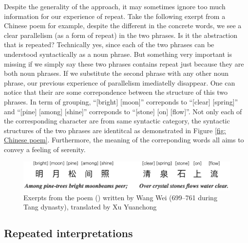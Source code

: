 Despite the generality of the approach, it may sometimes ignore too much information for our experience of repeat. Take the following exerpt from a Chinese poem for example, despite the different in the concrete words, we see a clear parallelism (as a form of repeat) in the two phrases. Is it the abstraction that is repeated? Technically yes, since each of the two phrases can be understood syntactically as a noun phrase. But something very important is missing if we simply say these two phrases contains repeat just because they are both noun phrases. If we substitute the second phrase with any other noun phrase, our previous experience of parallelism imediatelly disappear. One can notice that their are some correpondence between the structure of this two phrases. In term of grouping, ``[bright] [moon]'' correponds to ``[clear] [spring]'' and ``[pine] [among] [shine]'' correponds to ``[stone] [on] [flow]''. Not only each of the corresponding character are from same syntactic category, the syntactic structures of the two phrases are identitcal as demonstrated in Figure \ref{fig: Chinese poem}. Furthermore, the meaning of the correponding words all aims to convey a feeling of serenity.  
\begin{figure}
    \centering 
    \includegraphics[width=0.8\linewidth]{chinese peom surface}
    \caption{Exerpts from the poem () written by Wang Wei (699–761 during Tang dynasty), translated by Xu Yuanchong}
    \label{fig: Chinese poem surface}
\end{figure}

\subsection{Repeated interpretations}








